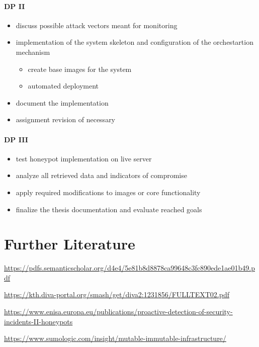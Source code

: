 \documentclass[12pt,a4paper,twoside]{report}
\begin{document}
\subsubsection{DP II}\label{dp-ii}

\begin{itemize}
\item
  discuss possible attack vectors meant for monitoring
\item
  implementation of the system skeleton and configuration of the
  orchestartion mechanism

  \begin{itemize}
  \item
    create base images for the system
  \item
    automated deployment
  \end{itemize}
\item
  document the implementation
\item
  assignment revision of necessary
\end{itemize}

\subsubsection{DP III}\label{dp-iii}

\begin{itemize}
\item
  test honeypot implementation on live server
\item
  analyze all retrieved data and indicators of compromise
\item
  apply required modifications to images or core functionality
\item
  finalize the thesis documentation and evaluate reached goals
\end{itemize}

\chapter{Further Literature}\label{further-literature}

\url{https://pdfs.semanticscholar.org/d4e4/5e81b8d8878ca99648c3fc890ede1ae01b49.pdf}

\url{https://kth.diva-portal.org/smash/get/diva2:1231856/FULLTEXT02.pdf}

\url{https://www.enisa.europa.eu/publications/proactive-detection-of-security-incidents-II-honeypots}

\url{https://www.sumologic.com/insight/mutable-immutable-infrastructure/}
\end{document}
